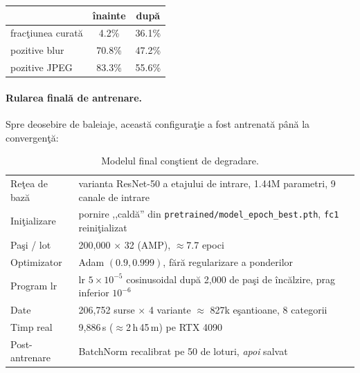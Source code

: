 \begin{center}
\begin{tabular}{lcc}
  \toprule
   & înainte & după \\
  \midrule
  fracţiunea curată      & 4.2\%  & 36.1\% \\
  pozitive blur          & 70.8\% & 47.2\% \\
  pozitive JPEG          & 83.3\% & 55.6\% \\
  \bottomrule
\end{tabular}
\end{center}

\paragraph{Rularea finală de antrenare.} Spre deosebire de baleiaje, această
configuraţie a fost antrenată până la convergenţă:

\begin{table}[h]
  \centering
  \caption{Modelul final conştient de degradare.}
  \label{tab:final-training}
  \begin{tabular}{ll}
    \toprule
    Reţea de bază      & varianta ResNet-50 a etajului de intrare, 1.44M parametri, 9 canale de intrare \\
    Iniţializare       & pornire ,,caldă'' din \texttt{pretrained/model\_epoch\_best.pth}, \texttt{fc1} reiniţializat \\
    Paşi / lot         & 200{,}000 $\times$ 32 (AMP), $\approx$7.7 epoci \\
    Optimizator        & Adam $(0.9, 0.999)$, fără regularizare a ponderilor \\
    Program lr         & lr $5\times10^{-5}$ cosinusoidal după 2{,}000 de paşi de încălzire, prag inferior $10^{-6}$ \\
    Date               & 206{,}752 surse $\times$ 4 variante $\approx$ 827k eşantioane, 8 categorii \\
    Timp real          & 9{,}886\,s ($\approx$2\,h\,45\,m) pe RTX 4090 \\
    Post-antrenare     & BatchNorm recalibrat pe 50 de loturi, \emph{apoi} salvat \\
    \bottomrule
  \end{tabular}
\end{table}

